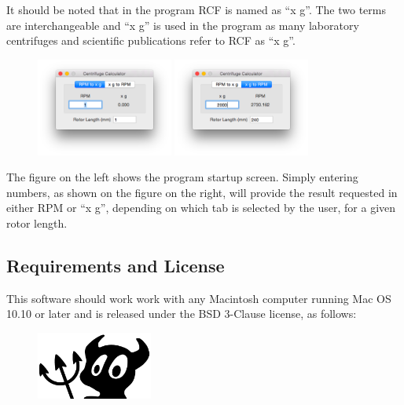 \documentclass[a4paper]{article}
\begin{document}
		\noindent It should be noted that in the program RCF is named as ``x g''. The two terms are interchangeable and ``x g'' is used in the program as many laboratory centrifuges and scientific publications refer to RCF as ``x g''.

		\begin{figure}[ht!]
			\centering
			\includegraphics[width=0.4\textwidth]{Graphics/ScreenOne} \includegraphics[width=0.4\textwidth]{Graphics/ScreenTwo}
		\end{figure}

		\noindent The figure on the left shows the program startup screen. Simply entering numbers, as shown on the figure on the right, will provide the result requested in either RPM or ``x g'', depending on which tab is selected by the user, for a given rotor length.

		\clearpage


	\begin{centering}
 		\section*{Requirements and License}
 		\label{sec:requirements_and_license}
	\end{centering} 
		
			\noindent This software should work work with any Macintosh computer running Mac OS 10.10 or later and is released under the BSD 3-Clause license, as follows:

			\begin{figure}[ht!]
				\centering
				\includegraphics[height=6em]{Graphics/BSD}
			\end{figure}
\end{document}
